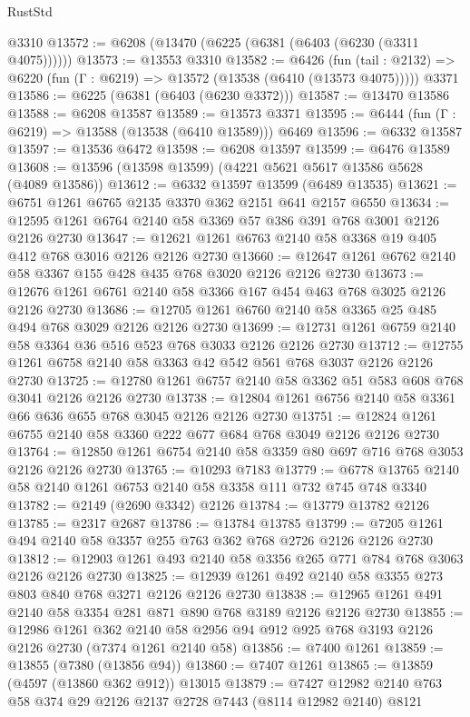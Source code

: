 \begin{lexlean}{RustStd}
\begin{coremodule}
    @3310
@13572 := @6208 (@13470 (@6225 (@6381 (@6403 (@6230 (@3311 @4075))))))
@13573 := @13553 @3310
@13582 := @6426
    (fun (tail : @2132) => @6220 (fun (Γ : @6219) => @13572 (@13538 (@6410 (@13573 @4075)))))
    @3371
@13586 := @6225 (@6381 (@6403 (@6230 @3372)))
@13587 := @13470 @13586
@13588 := @6208 @13587
@13589 := @13573 @3371
@13595 := @6444 (fun (Γ : @6219) => @13588 (@13538 (@6410 @13589))) @6469
@13596 := @6332 @13587
@13597 := @13536 @6472
@13598 := @6208 @13597
@13599 := @6476 @13589
@13608 := @13596 (@13598 @13599) (@4221 @5621 @5617 @13586 @5628 (@4089 @13586))
@13612 := @6332 @13597 @13599 (@6489 @13535)
@13621 := @6751 @1261 @6765 @2135 @3370 @362 @2151 @641 @2157 @6550
@13634 := @12595 @1261 @6764 @2140 @58 @3369 @57 @386 @391 @768 @3001 @2126 @2126 @2730
@13647 := @12621 @1261 @6763 @2140 @58 @3368 @19 @405 @412 @768 @3016 @2126 @2126 @2730
@13660 := @12647 @1261 @6762 @2140 @58 @3367 @155 @428 @435 @768 @3020 @2126 @2126 @2730
@13673 := @12676 @1261 @6761 @2140 @58 @3366 @167 @454 @463 @768 @3025 @2126 @2126 @2730
@13686 := @12705 @1261 @6760 @2140 @58 @3365 @25 @485 @494 @768 @3029 @2126 @2126 @2730
@13699 := @12731 @1261 @6759 @2140 @58 @3364 @36 @516 @523 @768 @3033 @2126 @2126 @2730
@13712 := @12755 @1261 @6758 @2140 @58 @3363 @42 @542 @561 @768 @3037 @2126 @2126 @2730
@13725 := @12780 @1261 @6757 @2140 @58 @3362 @51 @583 @608 @768 @3041 @2126 @2126 @2730
@13738 := @12804 @1261 @6756 @2140 @58 @3361 @66 @636 @655 @768 @3045 @2126 @2126 @2730
@13751 := @12824 @1261 @6755 @2140 @58 @3360 @222 @677 @684 @768 @3049 @2126 @2126 @2730
@13764 := @12850 @1261 @6754 @2140 @58 @3359 @80 @697 @716 @768 @3053 @2126 @2126 @2730
@13765 := @10293 @7183
@13779 := @6778 @13765 @2140 @58 @2140 @1261 @6753 @2140 @58 @3358 @111 @732 @745 @748 @3340
@13782 := @2149 (@2690 @3342) @2126
@13784 := @13779 @13782 @2126
@13785 := @2317 @2687
@13786 := @13784 @13785
@13799 := @7205 @1261 @494 @2140 @58 @3357 @255 @763 @362 @768 @2726 @2126 @2126 @2730
@13812 := @12903 @1261 @493 @2140 @58 @3356 @265 @771 @784 @768 @3063 @2126 @2126 @2730
@13825 := @12939 @1261 @492 @2140 @58 @3355 @273 @803 @840 @768 @3271 @2126 @2126 @2730
@13838 := @12965 @1261 @491 @2140 @58 @3354 @281 @871 @890 @768 @3189 @2126 @2126 @2730
@13855 := @12986
    @1261
    @362
    @2140
    @58
    @2956
    @94
    @912
    @925
    @768
    @3193
    @2126
    @2126
    @2730
    (@7374 @1261 @2140 @58)
@13856 := @7400 @1261
@13859 := @13855 (@7380 (@13856 @94))
@13860 := @7407 @1261
@13865 := @13859 (@4597 (@13860 @362 @912)) @13015
@13879 := @7427 @12982 @2140 @763 @58 @374 @29 @2126 @2137 @2728 @7443 (@8114 @12982 @2140) @8121

\end{coremodule}
\end{lexlean}
